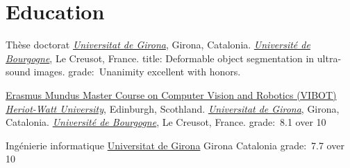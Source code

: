\section{Education}

{Th\`ese doctorat}
{}
{}
{}
{\href{http://www.udg.edu}{\emph{Universitat de Girona}}, Girona, Catalonia.
  \newline\href{http://www.u-bourgogne.fr}{\emph{Universit\'{e} de Bourgogne}}, Le Creusot, France.
  title: Deformable object segmentation in ultra-sound images.
  \newline grade:~Unanimity excellent with honors.
}

{\href{http://www.vibot.org}{Erasmus Mundus Master Course on Computer Vision and Robotics (VIBOT)}}
{}
{}
{}
{\href{http://www.hw.ac.uk}{\emph{Heriot-Watt University}}, Edinburgh, Scothland.
  \newline\href{http://www.udg.edu}{\emph{Universitat de Girona}}, Girona, Catalonia.
  \newline\href{http://www.u-bourgogne.fr}{\emph{Universit\'{e} de Bourgogne}}, Le Creusot, France.
  \newline grade:~8.1 over 10
}

                {Ing\'enierie informatique}
                {\newline\href{http://www.udg.edu}{Universitat de Girona}}
                {Girona}
                {Catalonia}
                {
grade:~7.7 over 10
                }

